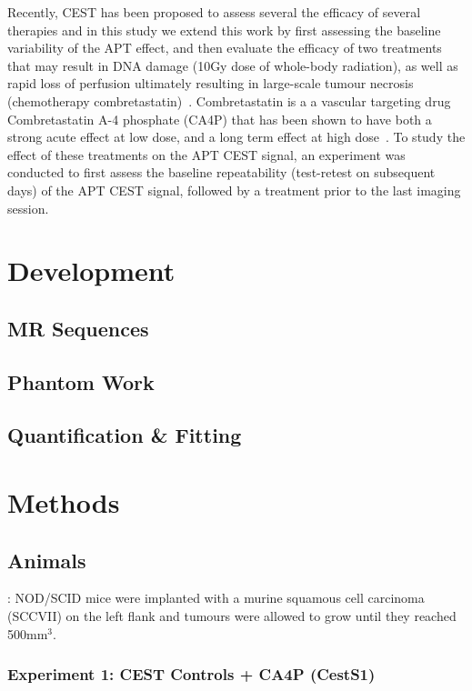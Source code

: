 Recently, CEST has been proposed to assess several the efficacy of several therapies and in this study we extend this work by first assessing the baseline variability of the APT effect, and then evaluate the efficacy of two treatments that may result in DNA damage (10Gy dose of whole-body radiation), as well as rapid loss of perfusion ultimately resulting in large-scale tumour necrosis (chemotherapy combretastatin)~\cite{Maxwell:2002da}.
Combretastatin is a a vascular targeting drug Combretastatin A-4 phosphate (CA4P) that has been shown to have both a strong acute effect at low dose, and a long term effect at high dose~\cite{Maxwell:2002da}.
To study the effect of these treatments on the APT CEST signal, an experiment was conducted to first assess the baseline repeatability (test-retest on subsequent days) of the APT CEST signal, followed by a treatment prior to the last imaging session.

\section{Development}

\subsection{MR Sequences}

\subsection{Phantom Work}

\subsection{Quantification \& Fitting}

\section{Methods}

\subsection{Animals}: NOD/SCID mice were implanted with a murine squamous cell carcinoma (SCCVII) on the left flank and tumours were allowed to grow until they reached 500mm$^3$.


\subsubsection{Experiment 1: CEST Controls + CA4P (CestS1)}

